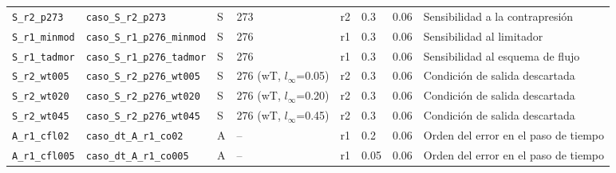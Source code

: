 \begin{longtable}{p{2.0cm}p{5.0cm}p{0.8cm}p{1.7cm}p{0.8cm}p{0.7cm}p{0.8cm}p{2.5cm}}
\scriptsize \texttt{S\_\allowbreak r2\_\allowbreak p273} & \scriptsize \texttt{caso\_\allowbreak S\_\allowbreak r2\_\allowbreak p273} & \scriptsize S & \scriptsize 273 & \scriptsize r2 & \scriptsize 0.3 & \scriptsize 0.06 & \scriptsize Sensibilidad a la contrapresión \\
\scriptsize \texttt{S\_\allowbreak r1\_\allowbreak minmod} & \scriptsize \texttt{caso\_\allowbreak S\_\allowbreak r1\_\allowbreak p276\_\allowbreak minmod} & \scriptsize S & \scriptsize 276 & \scriptsize r1 & \scriptsize 0.3 & \scriptsize 0.06 & \scriptsize Sensibilidad al limitador \\
\scriptsize \texttt{S\_\allowbreak r1\_\allowbreak tadmor} & \scriptsize \texttt{caso\_\allowbreak S\_\allowbreak r1\_\allowbreak p276\_\allowbreak tadmor} & \scriptsize S & \scriptsize 276 & \scriptsize r1 & \scriptsize 0.3 & \scriptsize 0.06 & \scriptsize Sensibilidad al esquema de flujo \\
\scriptsize \texttt{S\_\allowbreak r2\_\allowbreak wt005} & \scriptsize \texttt{caso\_\allowbreak S\_\allowbreak r2\_\allowbreak p276\_\allowbreak wt005} & \scriptsize S & \scriptsize 276 (wT, $l_\infty$=0.05) & \scriptsize r2 & \scriptsize 0.3 & \scriptsize 0.06 & \scriptsize Condición de salida descartada \\
\scriptsize \texttt{S\_\allowbreak r2\_\allowbreak wt020} & \scriptsize \texttt{caso\_\allowbreak S\_\allowbreak r2\_\allowbreak p276\_\allowbreak wt020} & \scriptsize S & \scriptsize 276 (wT, $l_\infty$=0.20) & \scriptsize r2 & \scriptsize 0.3 & \scriptsize 0.06 & \scriptsize Condición de salida descartada \\
\scriptsize \texttt{S\_\allowbreak r2\_\allowbreak wt045} & \scriptsize \texttt{caso\_\allowbreak S\_\allowbreak r2\_\allowbreak p276\_\allowbreak wt045} & \scriptsize S & \scriptsize 276 (wT, $l_\infty$=0.45) & \scriptsize r2 & \scriptsize 0.3 & \scriptsize 0.06 & \scriptsize Condición de salida descartada \\
\scriptsize \texttt{A\_\allowbreak r1\_\allowbreak cfl02} & \scriptsize \texttt{caso\_\allowbreak dt\_\allowbreak A\_\allowbreak r1\_\allowbreak co02} & \scriptsize A & \scriptsize -- & \scriptsize r1 & \scriptsize 0.2 & \scriptsize 0.06 & \scriptsize Orden del error en el paso de tiempo \\
\scriptsize \texttt{A\_\allowbreak r1\_\allowbreak cfl005} & \scriptsize \texttt{caso\_\allowbreak dt\_\allowbreak A\_\allowbreak r1\_\allowbreak co005} & \scriptsize A & \scriptsize -- & \scriptsize r1 & \scriptsize 0.05 & \scriptsize 0.06 & \scriptsize Orden del error en el paso de tiempo \\

\end{longtable}
